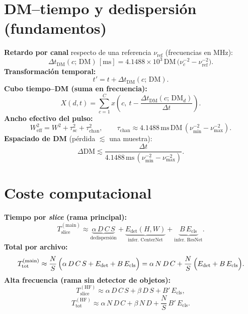 \section{DM--tiempo y dedispersión (fundamentos)}
\noindent \textbf{Retardo por canal} respecto de una referencia \(\nu_{\mathrm{ref}}\) (frecuencias en MHz):
\begin{equation}\label{eq:delta_t_dm_ref}
\Delta t_{\mathrm{DM}}(c;\,\mathrm{DM})\,[\mathrm{ms}] = 4.1488\times10^{3}\,\mathrm{DM}\,\big(\nu_c^{-2} - \nu_{\mathrm{ref}}^{-2}\big).
\end{equation}
\noindent \textbf{Transformación temporal:}
\begin{equation}\label{eq:tprime}
t' = t + \Delta t_{\mathrm{DM}}(c;\,\mathrm{DM}).
\end{equation}
\noindent \textbf{Cubo tiempo--DM (suma en frecuencia):}
\begin{equation}\label{eq:cube_sum}
X(d,t) = \sum_{c=1}^{C} x\!\left(c,\ t - \frac{\Delta t_{\mathrm{DM}}(c;\,\mathrm{DM}_d)}{\Delta t}\right).
\end{equation}
\noindent \textbf{Ancho efectivo del pulso:}
\begin{equation}\label{eq:weff}
W_{\mathrm{eff}}^2 = W^2 + \tau_{\mathrm{sc}}^2 + \tau_{\mathrm{chan}}^2,\qquad \tau_{\mathrm{chan}} \approx 4.1488\,\mathrm{ms}\,\mathrm{DM}\,(\nu_{\min}^{-2}-\nu_{\max}^{-2}).
\end{equation}
\noindent \textbf{Espaciado de DM} (pérdida \(\lesssim\) una muestra):
\begin{equation}\label{eq:dm_spacing}
\Delta\mathrm{DM} \lesssim \frac{\Delta t}{4.1488\,\mathrm{ms}\,(\nu_{\min}^{-2}-\nu_{\max}^{-2})}.
\end{equation}

\section{Coste computacional}
\noindent \textbf{Tiempo por \emph{slice} (rama principal):}
\begin{equation}\label{eq:t_slice_main}
T_{\mathrm{slice}}^{\mathrm{(main)}} \approx \underbrace{\alpha\,D\,C\,S}_{\text{dedispersión}} + \underbrace{E_{\mathrm{det}}(H,W)}_{\text{infer. CenterNet}} + \underbrace{B\,E_{\mathrm{cls}}}_{\text{infer. ResNet}}.
\end{equation}
\noindent \textbf{Total por archivo:}
\begin{equation}\label{eq:t_total_main}
T_{\mathrm{tot}}^{\mathrm{(main)}} \approx \frac{N}{S}\,\Bigl(\alpha\,D\,C\,S + E_{\mathrm{det}} + B\,E_{\mathrm{cls}}\Bigr) = \alpha\,N\,D\,C + \frac{N}{S}\,\Bigl(E_{\mathrm{det}} + B\,E_{\mathrm{cls}}\Bigr).
\end{equation}
\noindent \textbf{Alta frecuencia (rama sin detector de objetos):}
\begin{equation}\label{eq:t_slice_hf}
T_{\mathrm{slice}}^{\mathrm{(HF)}} \approx \alpha\,D\,C\,S + \beta\,D\,S + B'\,E_{\mathrm{cls}},
\end{equation}
\begin{equation}\label{eq:t_total_hf}
T_{\mathrm{tot}}^{\mathrm{(HF)}} \approx \alpha\,N\,D\,C + \beta\,N\,D + \frac{N}{S}\,B'\,E_{\mathrm{cls}}.
\end{equation}

